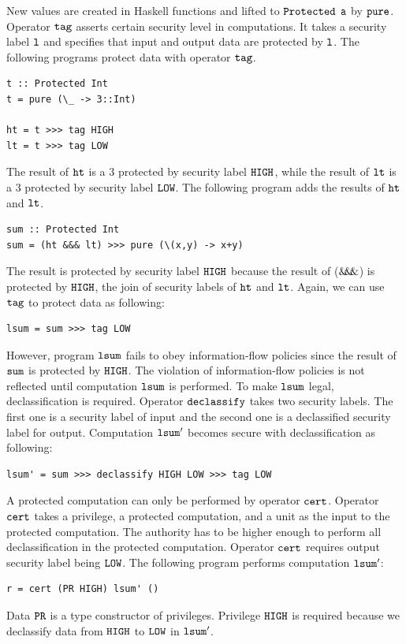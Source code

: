 \documentclass[a4paper]{report}
\newcommand{\arrowop}[1]{$#1\negthickspace #1\negthickspace #1$}
\newcommand{\co}[1]{$\cod{#1}$}
\begin{document}
New values are created in Haskell functions and lifted to \co{Protected} \co{a} by 
\co{pure}. Operator \co{tag} asserts certain security level in computations. 
It takes a security label \co{l} and specifies that input and output data are protected
by \co{l}. The following programs protect data with operator \co{tag}.
\begin{Verbatim}[fontsize=\footnotesize]
t :: Protected Int
t = pure (\_ -> 3::Int)

ht = t >>> tag HIGH
lt = t >>> tag LOW
\end{Verbatim}
The result of \co{ht} is a 3 protected by security label \co{HIGH}, while
the result of \co{lt} is a 3 protected by security label \co{LOW}.
The following program adds the results of \co{ht} and \co{lt}.
\begin{Verbatim}[fontsize=\footnotesize]
sum :: Protected Int
sum = (ht &&& lt) >>> pure (\(x,y) -> x+y)
\end{Verbatim}
The result is protected by security label \co{HIGH} because the result of (\arrowop{\&})
is protected by \co{HIGH}, the join of security labels of $\mathtt{ht}$ and $\mathtt{lt}$.
Again, we can use \co{tag} to protect data as following:
\begin{Verbatim}[fontsize=\footnotesize]
lsum = sum >>> tag LOW
\end{Verbatim}
However, program \co{lsum} fails to obey information-flow policies since the result of \co{sum}
is protected by \co{HIGH}. The violation of information-flow policies is not reflected until
computation \co{lsum} is performed. To make \co{lsum} legal, declassification is required.
Operator \co{declassify} takes two security labels. The first one is a security label
of input and the second one is a declassified security label for output. 
Computation \co{lsum'} becomes secure with declassification as following:
\begin{Verbatim}[fontsize=\footnotesize]
lsum' = sum >>> declassify HIGH LOW >>> tag LOW
\end{Verbatim}
A protected computation can only be performed by operator \co{cert}.
Operator \co{cert} takes a privilege, a protected computation, and a unit as the input to
the protected computation.
The authority has to be higher enough to perform all declassification in the protected
computation. Operator \co{cert} requires output security label being \co{LOW}.
The following program performs computation \co{lsum'}:
\begin{Verbatim}[fontsize=\footnotesize]
r = cert (PR HIGH) lsum' () 
\end{Verbatim}
Data \co{PR} is a type constructor of privileges. Privilege \co{HIGH} is required because 
we declassify data from \co{HIGH} to \co{LOW} in \co{lsum'}.
\end{document}
